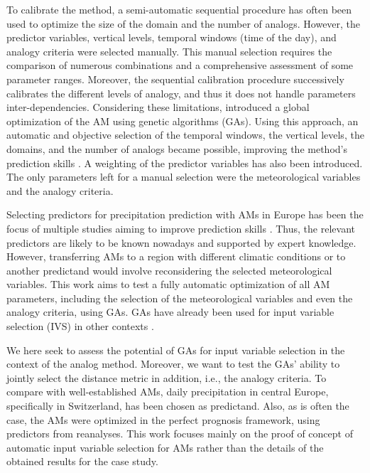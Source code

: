 \documentclass[draft]{agujournal2019}
\begin{document}
To calibrate the method, a semi-automatic sequential procedure \cite{Bontron2004, Radanovics2013, BenDaoud2016} has often been used to optimize the size of the domain and the number of analogs. However, the predictor variables, vertical levels, temporal windows (time of the day), and analogy criteria were selected manually. This manual selection requires the comparison of numerous combinations and a comprehensive assessment of some parameter ranges. Moreover, the sequential calibration procedure successively calibrates the different levels of analogy, and thus it does not handle parameters inter-dependencies. Considering these limitations,  introduced a global optimization of the AM using genetic algorithms (GAs). Using this approach, an automatic and objective selection of the temporal windows, the vertical levels, the domains, and the number of analogs became possible, improving the method's prediction skills \cite{Horton2018a}. A weighting of the predictor variables has also been introduced. The only parameters left for a manual selection were the meteorological variables and the analogy criteria.

Selecting predictors for precipitation prediction with AMs in Europe has been the focus of multiple studies aiming to improve prediction skills \cite{Obled2002, Bontron2004, Gibergans-Baguena2007, Radanovics2013, BenDaoud2016}. Thus, the relevant predictors are likely to be known nowadays and supported by expert knowledge. However, transferring AMs to a region with different climatic conditions or to another predictand would involve reconsidering the selected meteorological variables. This work aims to test a fully automatic optimization of all AM parameters, including the selection of the meteorological variables and even the analogy criteria, using GAs. GAs have already been used for input variable selection (IVS) in other contexts \cite{Dheygere2003, Huang2007, Cateni2010, Gobeyn2017}.

We here seek to assess the potential of GAs for input variable selection in the context of the analog method. Moreover, we want to test the GAs' ability to jointly select the distance metric in addition, i.e., the analogy criteria. To compare with well-established AMs, daily precipitation in central Europe, specifically in Switzerland, has been chosen as predictand. Also, as is often the case, the AMs were optimized in the perfect prognosis framework, using predictors from reanalyses. This work focuses mainly on the proof of concept of automatic input variable selection for AMs rather than the details of the obtained results for the case study.
\end{document}
